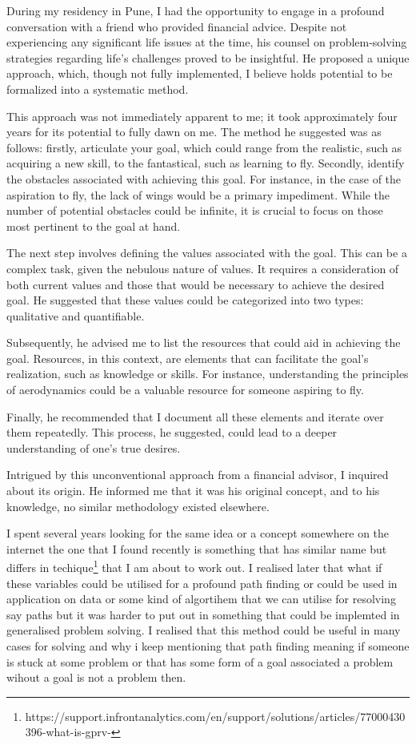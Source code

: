 \documentclass{article}
\begin{document}
During my residency in Pune, I had the opportunity to engage in a profound conversation with a friend who provided financial advice. Despite not experiencing any significant life issues at the time, his counsel on problem-solving strategies regarding life's challenges proved to be insightful. He proposed a unique approach, which, though not fully implemented, I believe holds potential to be formalized into a systematic method.

This approach was not immediately apparent to me; it took approximately four years for its potential to fully dawn on me. The method he suggested was as follows: firstly, articulate your goal, which could range from the realistic, such as acquiring a new skill, to the fantastical, such as learning to fly. Secondly, identify the obstacles associated with achieving this goal. For instance, in the case of the aspiration to fly, the lack of wings would be a primary impediment. While the number of potential obstacles could be infinite, it is crucial to focus on those most pertinent to the goal at hand.

The next step involves defining the values associated with the goal. This can be a complex task, given the nebulous nature of values. It requires a consideration of both current values and those that would be necessary to achieve the desired goal. He suggested that these values could be categorized into two types: qualitative and quantifiable.

Subsequently, he advised me to list the resources that could aid in achieving the goal. Resources, in this context, are elements that can facilitate the goal's realization, such as knowledge or skills. For instance, understanding the principles of aerodynamics could be a valuable resource for someone aspiring to fly.

Finally, he recommended that I document all these elements and iterate over them repeatedly. This process, he suggested, could lead to a deeper understanding of one's true desires.

Intrigued by this unconventional approach from a financial advisor, I inquired about its origin. He informed me that it was his original concept, and to his knowledge, no similar methodology existed elsewhere.

I spent several years looking for the same idea or a concept somewhere on the internet the one that I found recently is something that has similar name but differs in techique\footnote{https://support.infrontanalytics.com/en/support/solutions/articles/77000430396-what-is-gprv-} that I am about to work out. I realised later that what if these variables could be utilised for a profound path finding or could be used in application on data or some kind of algortihem that we can utilise for resolving say paths but it was harder to put out in something that could be implemted in generalised problem solving. I realised that this method could be useful in many cases for solving and why i keep mentioning that path finding meaning if someone is stuck at some problem or that has some form of a goal associated a problem wihout a goal is not a problem then.
\end{document}
